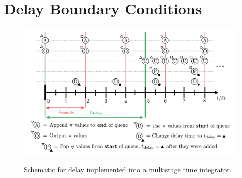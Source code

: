 \section{Delay Boundary Conditions}


\begin{figure}[t]
\centering
\includegraphics[scale=0.43]{assets/imgs/delay_bc_code_schematic.pdf}
\label{fig:schematic}
\caption{Schematic for delay implemented into a multistage time integrator.}
\end{figure}





